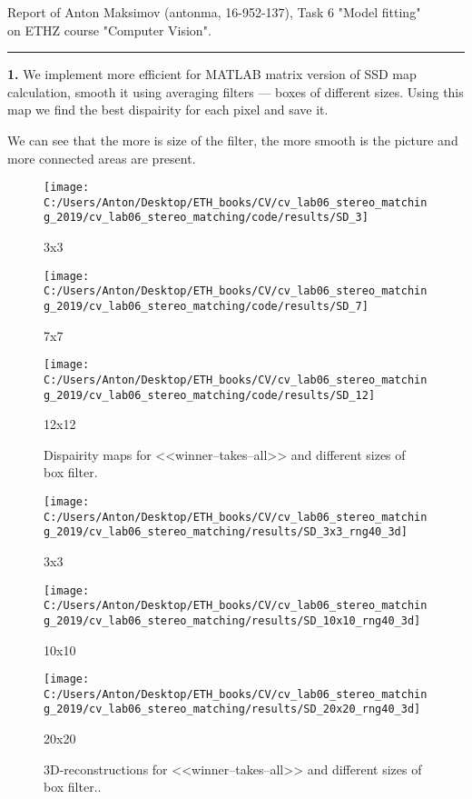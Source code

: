 \documentclass{report}
\begin{document}
\large
Report of Anton Maksimov (antonma, 16-952-137), Task 6 "Model fitting"\\
 on ETHZ course "Computer Vision".\\
\rule{\linewidth}{1pt}
	\textbf{1.} We implement more efficient for MATLAB matrix version of SSD map calculation, smooth it using averaging filters --- boxes of different sizes. Using this map we find the best dispairity for each pixel and save it. 
	
	We can see that the more is size of the filter, the more smooth is the picture and more connected areas are present.
	\begin{figure}[h]
		\begin{center}
			\begin{minipage}[h]{0.45\linewidth}
				\texttt{[image: C:/Users/Anton/Desktop/ETH\_books/CV/cv\_lab06\_stereo\_matching\_2019/cv\_lab06\_stereo\_matching/code/results/SD\_3]}
				\caption{3x3}
			\end{minipage}
		\hfill
		\begin{minipage}[h]{0.45\linewidth}
			\texttt{[image: C:/Users/Anton/Desktop/ETH\_books/CV/cv\_lab06\_stereo\_matching\_2019/cv\_lab06\_stereo\_matching/code/results/SD\_7]}
			\caption{7x7}
		\end{minipage}
	\vfill
	\begin{minipage}[h]{0.45\linewidth}
		\texttt{[image: C:/Users/Anton/Desktop/ETH\_books/CV/cv\_lab06\_stereo\_matching\_2019/cv\_lab06\_stereo\_matching/code/results/SD\_12]}
		\caption{12x12}
	\end{minipage}
		\end{center}
	\caption{Dispairity maps for <<winner--takes--all>> and different sizes of box filter.}
	\end{figure}

	\begin{figure}[h]
	\begin{center}
		\begin{minipage}[h]{0.3\linewidth}
			\texttt{[image: C:/Users/Anton/Desktop/ETH\_books/CV/cv\_lab06\_stereo\_matching\_2019/cv\_lab06\_stereo\_matching/results/SD\_3x3\_rng40\_3d]}
			\caption{3x3}
		\end{minipage}
		\hfill
		\begin{minipage}[h]{0.3\linewidth}
			\texttt{[image: C:/Users/Anton/Desktop/ETH\_books/CV/cv\_lab06\_stereo\_matching\_2019/cv\_lab06\_stereo\_matching/results/SD\_10x10\_rng40\_3d]}
			\caption{10x10}
		\end{minipage}
		\hfill
		\begin{minipage}[h]{0.3\linewidth}
			\texttt{[image: C:/Users/Anton/Desktop/ETH\_books/CV/cv\_lab06\_stereo\_matching\_2019/cv\_lab06\_stereo\_matching/results/SD\_20x20\_rng40\_3d]}
			\caption{20x20}
		\end{minipage}
	\end{center}
	\caption{3D-reconstructions for <<winner--takes--all>> and different sizes of box filter..}
\end{figure}
\end{document}
